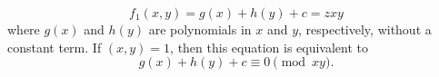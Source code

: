 \begin{proposition}
\[
    f_1(x,y)=g(x)+h(y)+c=zxy
\]
    where $g(x)$ and $h(y)$ are polynomials in $x$ and $y$, respectively, without a constant term. If $(x,y)=1$, then this equation is equivalent to
\[
    g(x)+h(y)+c\equiv0\pmod{xy}.
\]
\end{proposition}
